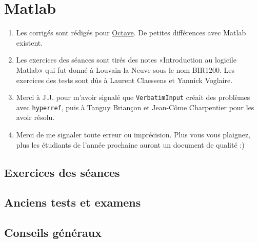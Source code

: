 \chapter{Matlab}

\begin{enumerate}

	\item
		Les corrigés sont rédigés pour \href{http://qtoctave.wordpress.com/}{Octave}. De petites différences avec Matlab existent.
	\item
		Les exercices des séances sont tirés des notes «Introduction au logicile Matlab» qui fut donné à Louvain-la-Neuve sous le nom BIR1200.  Les exercices des tests sont dûs à Laurent Claessens et Yannick Voglaire.
    \item
        Merci à J.J. pour m'avoir signalé que \texttt{VerbatimInput} créait des problèmes avec \texttt{hyperref}, puis à Tanguy Briançon et Jean-Côme Charpentier pour les avoir résolu.
	\item
		Merci de me signaler toute erreur ou imprécision. Plus vous vous plaignez, plus les étudiants de l'année prochaine auront un document de qualité :)
\end{enumerate}

\section{Exercices des séances}


\section{Anciens tests et examens}



\section{Conseils généraux}

